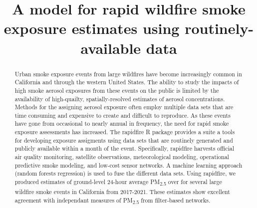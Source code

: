 \documentclass[gmd, manuscript]{copernicus}
\begin{document}
\title{A model for rapid wildfire smoke exposure estimates using
routinely-available data}











\received{}
\pubdiscuss{} %
\revised{}
\accepted{}
\published{}




\maketitle


\begin{abstract}
Urban smoke exposure events from large wildfires have become
increasingly common in California and through the western United States.
The ability to study the impacts of high smoke aerosol exposures from
these events on the public is limited by the availability of
high-quailty, spatially-resolved estimates of aerosol concentrations.
Methods for the assigning aerosol exposure often employ multiple data
sets that are time consuming and expensive to create and difficult to
reproduce. As these events have gone from occasional to nearly annual in
frequency, the need for rapid smoke exposure assessments has increased.
The rapidfire R package provides a suite a tools for developing exposure
assigments using data sets that are routinely generated and publicly
available within a month of the event. Specifically, rapidfire harvests
official air quality monitoring, satellite observations, meteorological
modeling, operational predictive smoke modeling, and low-cost sensor
networks. A machine learning approach (random forests regression) is
used to fuse the different data sets. Using rapidfire, we produced
estimates of ground-level 24-hour average PM\textsubscript{2.5} over for
several large wildfire smoke events in California from 2017-2021. These
estimates show excellent agreement with independant measures of
PM\textsubscript{2.5} from filter-based networks.
\end{abstract}
\end{document}
